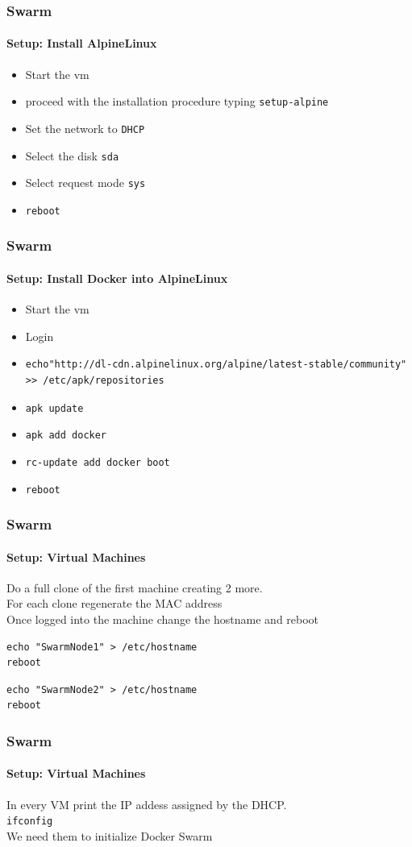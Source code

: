 \begin{frame}[fragile]
\frametitle{Swarm}
\framesubtitle{Setup: Install AlpineLinux}
\begin{itemize}
\item Start the vm 
\item proceed with the installation procedure typing \lstinline!setup-alpine!
\item Set the network to \lstinline!DHCP!\\
\item Select the disk \lstinline!sda!
\item Select request mode \lstinline!sys!
\item \lstinline!reboot!
\end{itemize}
\end{frame}


\begin{frame}[fragile]
\frametitle{Swarm}
\framesubtitle{Setup: Install Docker into AlpineLinux}
\begin{itemize}
\item Start the vm
\item Login
\item 
\tiny
\begin{lstlisting}
echo"http://dl-cdn.alpinelinux.org/alpine/latest-stable/community" >> /etc/apk/repositories
\end{lstlisting}
\normalsize
\item \lstinline!apk update!
\item \lstinline!apk add docker!
\item \lstinline!rc-update add docker boot!
\item \lstinline!reboot!
\end{itemize}
\end{frame}


\begin{frame}[fragile]
\frametitle{Swarm}
\framesubtitle{Setup: Virtual Machines}
Do a full clone of the first machine creating 2 more.\\
\vspace{0.4cm}
For each clone regenerate the MAC address\\
\vspace{0.4cm}
Once logged into the machine change the hostname and reboot\\
\begin{lstlisting}
echo "SwarmNode1" > /etc/hostname
reboot
\end{lstlisting}

\begin{lstlisting}
echo "SwarmNode2" > /etc/hostname
reboot
\end{lstlisting}
\end{frame}


\begin{frame}[fragile]
\frametitle{Swarm}
\framesubtitle{Setup: Virtual Machines}
In every VM print the IP addess assigned by the DHCP. \\
\lstinline!ifconfig! \\
We need them to initialize Docker Swarm
\end{frame}